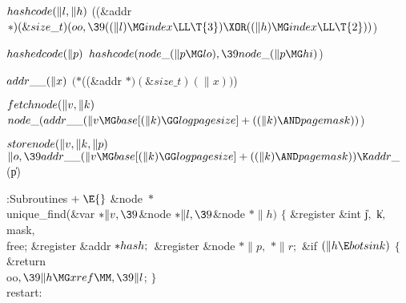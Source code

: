 \Y\B\4\D$\\{hashcode}(\|l,\|h)$ \5
((\&{addr} ${}{*})(\&{size\_t})(\\{oo},\39((\|l)\MG\\{index}\LL\T{3})\XOR((\|h)%
\MG\\{index}\LL\T{2})){}$)\par
\B\4\D$\\{hashedcode}(\|p)$ \5
$\\{hashcode}(\\{node\_}(\|p\MG\\{lo}),\39\\{node\_}(\|p\MG\\{hi}){}$)\par
\B\4\D$\\{addr\_\_}(\|x)$ \5
$({*}{}$((\&{addr} ${}{*})(\&{size\_t})(\|x)){}$)\par
\B\4\D$\\{fetchnode}(\|v,\|k)$ \5
$\\{node\_}(\\{addr\_\_}(\|v\MG\\{base}[(\|k)\GG\\{logpagesize}]+((\|k)\AND%
\\{pagemask})){}$)\par
\B\4\D$\\{storenode}(\|v,\|k,\|p)$ \5
$\|o,\39\\{addr\_\_}(\|v\MG\\{base}[(\|k)\GG\\{logpagesize}]+((\|k)\AND%
\\{pagemask}))\K\\{addr\_}{}$(\|p)\par
\Y\B\4:Subroutines\X${}\mathrel+\E{}$\6
\&{node} ${}{*}{}$\\{unique\_find}(\&{var} ${}{*}\|v,\39{}$\&{node} ${}{*}\|l,%
\39{}$\&{node} ${}{*}\|h){}$\1\1\2\2\6
${}\{{}$\1\6
\&{register} \&{int} \|j${},{}$ \|k${},{}$ \\{mask}${},{}$ \\{free};\6
\&{register} \&{addr} ${}{*}\\{hash};{}$\6
\&{register} \&{node} ${}{*}\|p,{}$ ${}{*}\|r;{}$\7
\&{if} ${}(\|h\E\\{botsink}){}$\5
${}\{{}$\1\6
\&{return} \\{oo}${},\39\|h\MG\\{xref}\MM,\39\|l{}$;\6
\4${}\}{}$\2\6
\4\\{restart}:\5
